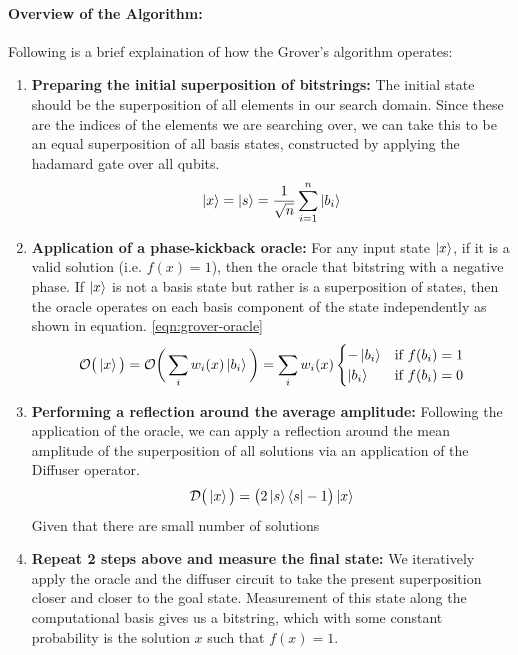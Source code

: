 \paragraph*{Overview of the Algorithm:} Following is a brief explaination of how the Grover's algorithm operates:

\begin{enumerate}
    \item \textbf{Preparing the initial superposition of bitstrings:} The initial state should be the superposition of all elements in our search domain. Since these are the indices of the elements we are searching over, we can take this to be an equal superposition of all basis states, constructed by applying the hadamard gate over all qubits.
    \begin{equation}
        \ket{x} = \ket{s} = \frac{1}{\sqrt{n}} \sum_{i=1}^{n} \ket{b_i}
    \end{equation}

    \item \textbf{Application of a phase-kickback oracle:} For any input state $\ket{x}$, if it is a valid solution (i.e. $f(x) = 1$), then the oracle that bitstring with a negative phase. If $\ket{x}$ is not a basis state but rather is a superposition of states, then the oracle operates on each basis component of the state independently as shown in equation. \ref{eqn:grover-oracle}
    \begin{equation}\label{eqn:grover-oracle}
        \mathcal{O} \big(\ket{x} \big) = \mathcal{O}\bigg(\sum_i w_i(x) \ket{b_i} \bigg) = \sum_i w_i(x) \begin{cases}
            -\ket{b_i} & \text{if } f(b_i) = 1 \\
            \ket{b_i} & \text{if } f(b_i) = 0
        \end{cases}
    \end{equation}
    
    \item \textbf{Performing a reflection around the average amplitude:} Following the application of the oracle, we can apply a reflection around the mean amplitude of the superposition of all solutions via an application of the Diffuser operator.
    \begin{equation}
        \mathcal{D} \big(\ket{x} \big) = \big( 2 \ket{s}\bra{s} - 1 \big) \ket{x}
    \end{equation}
    Given that there are small number of solutions 
    \item \textbf{Repeat 2 steps above and measure the final state:} We iteratively apply the oracle and the diffuser circuit to take the present superposition closer and closer to the goal state. Measurement of this state along the computational basis gives us a bitstring, which with some constant probability is the solution $x$ such that $f(x) = 1$.
\end{enumerate}

